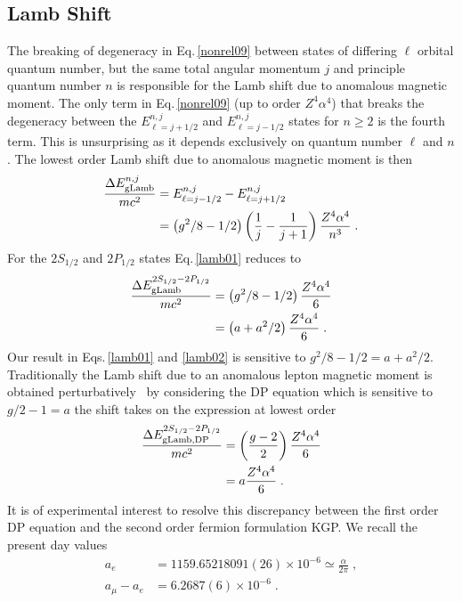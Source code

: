 \documentclass[epj]{svjour}
\begin{document}
\subsection{Lamb Shift} \label{lamb}
The breaking of degeneracy in Eq.\,\eqref{nonrel09} between states of differing $\ell$ orbital quantum number, but the same total angular momentum $j$ and principle quantum number $n$ is responsible for the Lamb shift due to anomalous magnetic moment. The only term in Eq.\,\eqref{nonrel09} (up to order $Z^{4}\alpha^{4}$) that breaks the degeneracy between the $E^{n,j}_{\ell=j+1/2}$ and $E^{n,j}_{\ell=j-1/2}$ states for $n\geq2$ is the fourth term. This is unsurprising as it depends exclusively on quantum number $\ell$ and $n$. The lowest order Lamb shift due to anomalous magnetic moment is then
\begin{alignat}{1}
\label{lamb01} \frac{\Delta E_{\mathrm{gLamb}}^{n,j}}{mc^{2}}&=E^{n,j}_{\ell=j-1/2}-E^{n,j}_{\ell=j+1/2}\\ \notag &=\left(g^{2}/8-1/2\right)\left(\frac{1}{j}-\frac{1}{j+1}\right)\frac{Z^{4}\alpha^{4}}{n^{3}}\;.
\end{alignat}
For the $2S_{1/2}$ and $2P_{1/2}$ states Eq.\,\eqref{lamb01} reduces to
\begin{alignat}{1}
\label{lamb02} \frac{\Delta E_{\mathrm{gLamb}}^{2S_{1/2}-2P_{1/2}}}{mc^{2}}&=\left(g^{2}/8-1/2\right)\frac{Z^{4}\alpha^{4}}{6}\\ \notag &=\left(a+a^{2}/2\right)\frac{Z^{4}\alpha^{4}}{6}\;.
\end{alignat}
Our result in Eqs.\,\eqref{lamb01} and \eqref{lamb02} is sensitive to $g^{2}/8-1/2=a+a^{2}/2$. Traditionally the Lamb shift due to an anomalous lepton magnetic moment is obtained perturbatively~\cite{iz80} by considering the DP equation which is sensitive to $g/2-1=a$ the shift takes on the expression at lowest order
\begin{alignat}{1}
\label{lamb03} \frac{\Delta E_{\mathrm{gLamb,DP}}^{2S_{1/2}-2P_{1/2}}}{mc^{2}}&=\left(\frac{g-2}{2}\right)\frac{Z^{4}\alpha^{4}}{6}\\ \notag &=a\frac{Z^{4}\alpha^{4}}{6}\;.
\end{alignat}
It is of experimental interest to resolve this discrepancy between the first order DP equation and the second order fermion formulation KGP. We recall the present day values
\begin{subequations}
\begin{alignat}{1}
\label{aeFULL} a_e&=1159.65218091(26)\times 10^{-6}\simeq \frac{\alpha}{2\pi}\;,\\
a_\mu-a_e&=6.2687(6)\times 10^{-6}\;.
\end{alignat}
\end{subequations}
\end{document}
